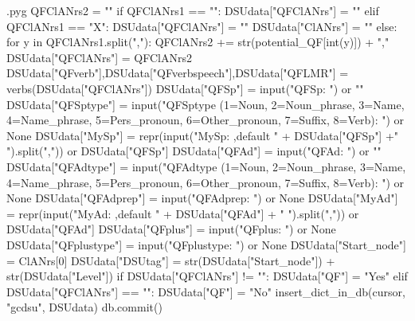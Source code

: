 \documentclass{report}
\makeatletter
\newenvironment{python}{%
  \VerbatimEnvironment
  \minted@resetoptions
  \setkeys{minted@opt}{}
      \begin{VerbatimOut}{\jobname.pyg}}
{%
      \end{VerbatimOut}
      \minted@pygmentize{python}
      \DeleteFile{\jobname.pyg}}
\makeatother
\begin{document}
\begin{python}
    QFClANrs2 = ""
    if QFClANrs1 == "":
        DSUdata["QFClANrs"] = ""
    elif QFClANrs1 == "X":
        DSUdata["QFClANrs"] = ""
        DSUdata["ClANrs"] = ""
    else:
        for y in QFClANrs1.split(","):
            QFClANrs2 += str(potential_QF[int(y)]) + ","
        DSUdata["QFClANrs"] = QFClANrs2
    DSUdata["QFverb"],DSUdata["QFverbspeech"],DSUdata["QFLMR"] = verbs(DSUdata["QFClANrs"])
    DSUdata["QFSp"] = input("QFSp: ") or ""
    DSUdata["QFSptype"] = input("QFSptype (1=Noun, 2=Noun_phrase, 3=Name, 4=Name_phrase, 5=Pers_pronoun, 6=Other_pronoun, 7=Suffix, 8=Verb): ") or None
    DSUdata["MySp"] = repr(input("MySp: ,default " + DSUdata["QFSp"] +" ").split(",")) or DSUdata["QFSp"]
    DSUdata["QFAd"] = input("QFAd: ") or ""
    DSUdata["QFAdtype"] = input("QFAdtype (1=Noun, 2=Noun_phrase, 3=Name, 4=Name_phrase, 5=Pers_pronoun, 6=Other_pronoun, 7=Suffix, 8=Verb): ") or None
    DSUdata["QFAdprep"] = input("QFAdprep: ") or None
    DSUdata["MyAd"] = repr(input("MyAd: ,default " + DSUdata["QFAd"] + " ").split(",")) or DSUdata["QFAd"]
    DSUdata["QFplus"] = input("QFplus: ") or None
    DSUdata["QFplustype"] = input("QFplustype: ") or None
    DSUdata["Start_node"] = ClANrs[0]
    DSUdata["DSUtag"] = str(DSUdata["Start_node"]) + str(DSUdata["Level"])
    if DSUdata["QFClANrs"] != "":
        DSUdata["QF"] = "Yes"
    elif DSUdata["QFClANrs"] == "":
        DSUdata["QF"] = "No"
    insert_dict_in_db(cursor, "gcdsu", DSUdata)
    db.commit()

\end{python}
\end{document}
